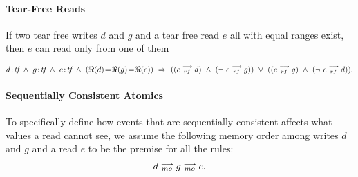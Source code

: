         \paragraph{Tear-Free Reads} 
            If two tear free writes $d$ and $g$ and a tear free read $e$ all with equal ranges exist, then $e$ can read only from one of them
                
            \begin{align*}
                \et{d}{tf}\ \wedge\ \et{g}{tf} \ \wedge \ \et{e}{tf} 
                  \ \wedge \ 
                  (\Re(d) \!=\! \Re(g) \!=\! \Re(e)) 
                  \ \Rightarrow{} \ 
                      ((\reln{e}{rf}{d}) 
                      \ \wedge \ 
                      (\neg \ \reln{e}{rf}{g})) 
                  \ \vee \  
                      ((\reln{e}{rf}{g}) 
                      \ \wedge \
                      (\neg \ \reln{e}{rf}{d})).
            \end{align*}
                    
            
        \paragraph{Sequentially Consistent Atomics} 
            To specifically define how events that are sequentially consistent affects what values a read cannot see, we assume the following memory order among writes $d$ and $g$ and a read $e$ to be the premise for all the rules:  
                \begin{align*}
                    d \stackrel{\longrightarrow}{_{mo}} g \stackrel{\longrightarrow}{_{mo}} e.
                \end{align*}
               
